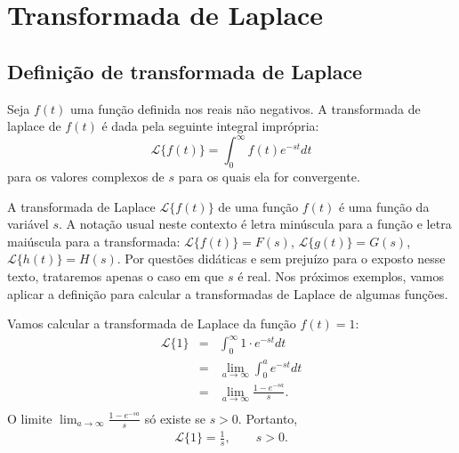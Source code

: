 \setlength{\headheight}{30pt} %
\chapter{Transformada de Laplace}
\section{Definição de transformada de Laplace}{\label{sec_1}}
\begin{defn}Seja $f(t)$ uma função definida nos reais não negativos. A transformada de laplace de $f(t)$ é dada pela seguinte integral imprópria:
\begin{equation}
{\mathcal{L}}\{f(t)\}=\int_0^\infty f(t)e^{-st}dt
\end{equation}
para os valores complexos de $s$ para os quais ela for convergente.
\end{defn}
A transformada de Laplace $\mathcal{L}\{f(t)\}$ de uma função $f(t)$ é uma função da variável $s$. A notação usual neste contexto é letra minúscula para a função e letra maiúscula para a transformada: $\mathcal{L}\{f(t)\}=F(s)$, $\mathcal{L}\{g(t)\}=G(s)$, $\mathcal{L}\{h(t)\}=H(s)$.
Por questões didáticas e sem prejuízo para o exposto nesse texto, trataremos apenas o caso em que $s$ é real. 
Nos próximos exemplos, vamos aplicar a definição para calcular a transformadas de Laplace de algumas funções.
\begin{ex}\label{ex1} Vamos calcular a transformada de Laplace da função $f(t)=1$:
\begin{eqnarray*}
\mathcal{L}\{1\}&=&\int_0^\infty 1\cdot e^{-st}dt\\
&=&\lim_{a\to\infty}\int_0^a  e^{-st}dt\\
&=&\lim_{a\to\infty} \frac{1-e^{-sa}}{s}.\\
\end{eqnarray*}
O limite $\displaystyle\lim_{a\to\infty}\frac{1-e^{-sa}}{s}$ só existe se $s>0$. Portanto,
\begin{eqnarray*}
\mathcal{L}\{1\}=\frac{1}{s},\qquad s>0.\\
\end{eqnarray*}
\end{ex}
